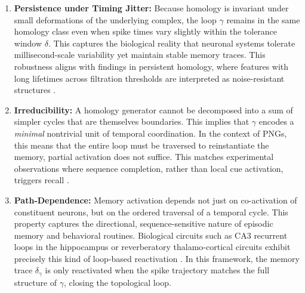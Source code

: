 \documentclass[lettersize,journal]{IEEEtran}
\begin{document}
\begin{enumerate}
    \item \textbf{Persistence under Timing Jitter:} 
    Because homology is invariant under small deformations of the underlying complex, the loop \( \gamma \) remains in the same homology class even when spike times vary slightly within the tolerance window \( \delta \). This captures the biological reality that neuronal systems tolerate millisecond-scale variability yet maintain stable memory traces. This robustness aligns with findings in persistent homology, where features with long lifetimes across filtration thresholds are interpreted as noise-resistant structures \cite{edelsbrunner2010computational,ghrist2008barcodes}.

    \item \textbf{Irreducibility:} 
    A homology generator cannot be decomposed into a sum of simpler cycles that are themselves boundaries. This implies that \( \gamma \) encodes a \emph{minimal} nontrivial unit of temporal coordination. In the context of PNGs, this means that the entire loop must be traversed to reinstantiate the memory, partial activation does not suffice. This matches experimental observations where sequence completion, rather than local cue activation, triggers recall \cite{pastalkova2008internally,buzsaki2010neural}.

    \item \textbf{Path-Dependence:} 
    Memory activation depends not just on co-activation of constituent neurons, but on the ordered traversal of a temporal cycle. This property captures the directional, sequence-sensitive nature of episodic memory and behavioral routines. Biological circuits such as CA3 recurrent loops in the hippocampus or reverberatory thalamo-cortical circuits exhibit precisely this kind of loop-based reactivation \cite{mcclelland1995there,buzsaki2006rhythms}. In this framework, the memory trace \( \delta_\gamma \) is only reactivated when the spike trajectory matches the full structure of \( \gamma \), closing the topological loop.
\end{enumerate}
\end{document}
